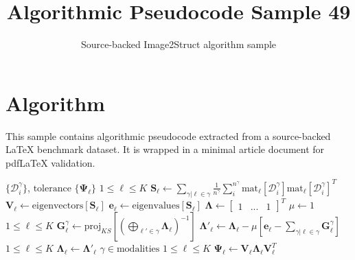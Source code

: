 \documentclass[11pt]{article}
\title{Algorithmic Pseudocode Sample 49}
\author{Source-backed Image2Struct algorithm sample}
\date{}
\begin{document}
\maketitle
\section{Algorithm}
This sample contains algorithmic pseudocode extracted from a source-backed LaTeX benchmark dataset. It is wrapped in a minimal article document for pdfLaTeX validation.

\begin{algorithm}[htbp]
\caption{Source-backed algorithmic procedure}
\begin{algorithm}
\begin{algorithmic}[1]
\Require $\{\mathcal{D}^\gamma_i\}$, $\mathrm{tolerance}$
\Ensure $\{\mathbf{\Psi}_\ell\}$
\For $1 \leq \ell \leq K$
\State $\mathbf{S}_\ell \gets \sum_{\gamma | \ell \in \gamma}\frac{1}{n^\gamma}\sum_i^{n^\gamma}\mathrm{mat}_\ell\left[\mathcal{D}^\gamma_i\right]\mathrm{mat}_\ell\left[\mathcal{D}^\gamma_i\right]^T$
\State $\mathbf{V}_\ell \gets \mathrm{eigenvectors}[\mathbf{S}_\ell ]$
\State $\mathbf{e}_\ell \gets \mathrm{eigenvalues}[\mathbf{S}_\ell ]$
\EndFor
\State $\mathbf{\Lambda} \gets \begin{bmatrix}
1 & ... & 1
\end{bmatrix}
^T$
\State $\mu \gets 1$
\While {}
\For $1 \leq \ell \leq K$
\State $\mathbf{G}^\gamma_\ell \gets \mathrm{proj}_{KS}\left[\left(\bigoplus_{\ell'\in\gamma}\mathbf{\Lambda}_\ell\right)^{-1}\right]$
\State $\mathbf{\Lambda}'_\ell \gets \mathbf{\Lambda}_\ell - \mu\left[\mathbf{e}_\ell - \sum_{\gamma | \ell\in\gamma}\mathbf{G}^\gamma_\ell\right]$
\EndFor
\For $1 \leq \ell \leq K$
\State $\mathbf{\Lambda}_\ell \gets \mathbf{\Lambda}'_\ell$
\EndFor
\For $\gamma \in \mathrm{modalities}$
\State {}
\EndIf
\EndFor
\EndWhile
\For $1 \leq \ell \leq K$
\State $\mathbf{\Psi}_\ell \gets \mathbf{V}_\ell \mathbf{\Lambda}_\ell \mathbf{V}_\ell^T$
\EndFor
\end{algorithmic}
\caption*{\textbf{The GmGM algorithm}}
\end{algorithm}
\end{algorithm}
\end{document}
